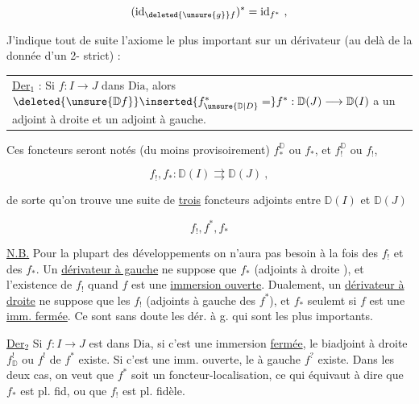 \[
(\mathrm{id}_{\deleted{\unsure{g}}f})^{*}=\mathrm{id}_{f^{*}}\ ,
\]


J'indique tout de suite l'axiome le plus important sur un dérivateur (au delà de la donnée d'un 2- strict) :

\begin{tabular}{||p{.88\linewidth}}
\uline{Der}$_{1}$ : Si $f:I\longrightarrow J$ dans $\mathrm{Dia}$, alors $\deleted{\unsure{\mathbb D f}}\inserted{f^{*}_{\unsure{\mathbb D|D}}=}f^{*}:\mathbb D(J)\longrightarrow\mathbb D(I)$ a un adjoint à droite et un adjoint à gauche.
\end{tabular}

Ces foncteurs seront notés (du moins provisoirement) $f_{*}^{\mathbb D}$ ou $f_{*}$, et $f_{!}^{\mathbb D}$ ou $f_{!}$,

\[
f_{!},f_{*}:\mathbb D(I)\rightrightarrows\mathbb D(J)\ ,
\]

de sorte qu'on trouve une suite de \uline{trois} foncteurs adjoints entre $\mathbb D(I)$ et $\mathbb D(J)$

\[
f_{!}, f^{*}, f_{*}
\]

\uline{N.B.} Pour  la plupart des développements on n'aura pas besoin  à la fois des $f_{!}$ et des $f_{*}$. Un \uline{dérivateur à gauche} ne suppose que  $f_{*}$ (adjoints à droite ), et l'existence de $f_{!}$  quand $f$ est une \uline{immersion ouverte}. Dualement, un \uline{dérivateur à droite} ne suppose que les $f_{!}$ (adjoints à gauche des $f^{*}$), et $f_{*}$ seulemt si $f$ est une \uline{imm. fermée}. Ce sont sans doute les dér. à g. qui sont les plus importants.


\uline{Der}$_{2}$ Si $f:I\longrightarrow J$ est dans $\mathrm{Dia}$, si c'est une immersion \uline{fermée}, le biadjoint à droite $f^{!}_{\mathbb D}$ ou $f^{!}$ de $f^{*}$ existe. Si c'est une imm. ouverte, le  à gauche $f^{?}$ existe. Dans les deux cas, on veut que $f^{*}$ soit un foncteur-localisation,  ce qui équivaut à dire que $f_{*}$ est pl. fid, ou que $f_{!}$ est pl. fidèle.



